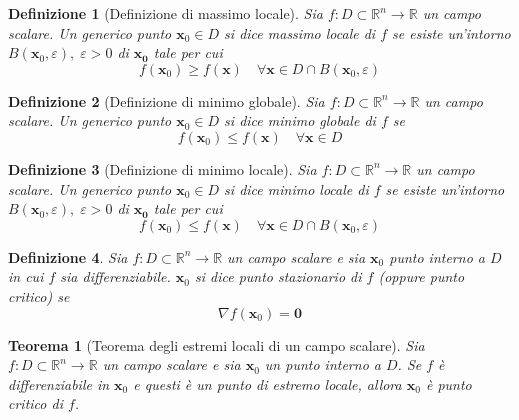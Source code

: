 \documentclass{article}
\newtheorem{theorem}{Teorema}
\newtheorem{definition}{Definizione}
\begin{document}
            \begin{definition}[Definizione di massimo locale]
                Sia $f: D \subset \mathbb{R}^{n} \rightarrow \mathbb{R}$ un campo scalare. Un generico punto $\mathbf{x}_0 \in D$ si dice massimo locale di $f$ se esiste un'intorno $B(\mathbf{x}_0, \varepsilon), \; \varepsilon > 0$ di
                $\mathbf{x_0}$ tale per cui 
                \[
                    f(\mathbf{x}_0) \geq f(\mathbf{x}) \quad \forall \mathbf{x} \in D \cap B(\mathbf{x}_0, \varepsilon)
                \]
            \end{definition}

            \begin{definition}[Definizione di minimo globale]
                Sia $f: D \subset \mathbb{R}^{n} \rightarrow \mathbb{R}$ un campo scalare. Un generico punto $\mathbf{x}_0 \in D$ si dice minimo globale di $f$ se 
                \[
                    f(\mathbf{x}_0) \leq f(\mathbf{x}) \quad \forall \mathbf{x} \in D
                \]
            \end{definition}

            \begin{definition}[Definizione di minimo locale]
                Sia $f: D \subset \mathbb{R}^{n} \rightarrow \mathbb{R}$ un campo scalare. Un generico punto $\mathbf{x}_0 \in D$ si dice minimo locale di $f$ se esiste un'intorno $B(\mathbf{x}_0, \varepsilon), \; \varepsilon > 0$ di
                $\mathbf{x_0}$ tale per cui 
                \[
                    f(\mathbf{x}_0) \leq f(\mathbf{x}) \quad \forall \mathbf{x} \in D \cap B(\mathbf{x}_0, \varepsilon)
                \]
            \end{definition}

            \begin{definition}
                Sia $f: D \subset \mathbb{R}^{n} \rightarrow \mathbb{R}$ un campo scalare e sia $\mathbf{x}_0$ punto interno a $D$ in cui $f$ sia differenziabile. $\mathbf{x}_0$ si dice punto stazionario di $f$ (oppure punto critico) se
                \[
                    \nabla f(\mathbf{x}_0) = \mathbf{0}
                \]
            \end{definition}
            
            \begin{theorem}[Teorema degli estremi locali di un campo scalare]
                Sia $f: D \subset \mathbb{R}^{n} \rightarrow \mathbb{R}$ un campo scalare e sia $\mathbf{x}_0$ un punto interno a $D$. 
                Se $f$ è differenziabile in $\mathbf{x}_0$ e questi è un punto di estremo locale, allora $\mathbf{x}_0$ è punto critico di $f$.
            \end{theorem}
\end{document}
